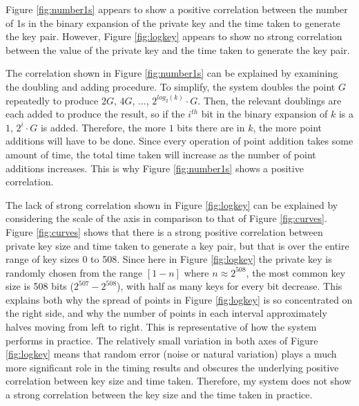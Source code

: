 \documentclass[12pt,a4paper]{article}
\begin{document}
\vspace{3mm}

Figure \ref{fig:number1s} appears to show a positive correlation between the number of 1s in the binary expansion of the private key and the time taken to generate the key pair. 
However, Figure \ref{fig:logkey} appears to show no strong correlation between the value of the private key and the time taken to generate the key pair. 

The correlation shown in Figure \ref{fig:number1s} can be explained by examining the doubling and adding procedure. 
To simplify, the system doubles the point $G$ repeatedly to produce $2G$, $4G$, ..., $2^{log_2(k)} \cdot G$. 
Then, the relevant doublings are each added to produce the result, 
so if the $i^{th}$ bit in the binary expansion of $k$ is a $1$, $2^i \cdot G$ is added. 
Therefore, the more $1$ bits there are in $k$, the more point additions will have to be done. 
Since every operation of point addition takes some amount of time, the total time taken will increase as the number of point additions increases. 
This is why Figure \ref{fig:number1s} shows a positive correlation. 

\vspace{3mm}

The lack of strong correlation shown in Figure \ref{fig:logkey} can be explained by considering the scale of the axis in comparison to that of 
Figure \ref{fig:curves}. 
Figure \ref{fig:curves} shows that there is a strong positive correlation between private key size and time taken to generate a key pair, 
but that is over the entire range of key sizes 0 to 508. 
Since here in Figure \ref{fig:logkey} the private key is randomly chosen from the range $[1-n]$ where $n \approx 2^{508}$, 
the most common key size is 508 bits ($2^{507}-2^{508}$), with half as many keys for every bit decrease. 
This explains both why the spread of points in Figure \ref{fig:logkey} is so concentrated on the right side, 
and why the number of points in each interval approximately halves moving from left to right. 
This is representative of how the system performs in practice. 
The relatively small variation in both axes of Figure \ref{fig:logkey} means that random error (noise or natural variation) 
plays a much more significant role in the timing results and obscures the underlying positive correlation between key size and time taken. 
Therefore, my system does not show a strong correlation between the key size and the time taken in practice. 
\end{document}

